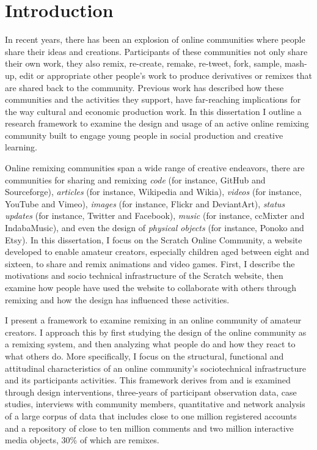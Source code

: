 \chapter{Introduction}

In recent years, there has been an explosion of online communities where people share their ideas and creations.
Participants of these communities not only share their own work, they also remix, re-create, remake, re-tweet, fork, sample, mash-up, edit or appropriate other people's work to produce derivatives or remixes that are shared back to the community.
Previous work has described how these communities and the activities they support, have far-reaching implications for the way cultural and economic production work.
In this dissertation I outline a research framework to examine the design and usage of an active online remixing community built to engage young people in social production and creative learning.

Online remixing communities span a wide range of creative endeavors, there are communities for sharing and remixing 
\emph{code} (for instance, GitHub and Sourceforge),
\emph{articles} (for instance, Wikipedia and Wikia), 
\emph{videos} (for instance, YouTube and Vimeo), 
\emph{images} (for instance, Flickr and DeviantArt), 
\emph{status updates} (for instance, Twitter and Facebook),
\emph{music} (for instance, ccMixter and IndabaMusic),
and even the design of \emph{physical objects} (for instance, Ponoko and Etsy).
In this dissertation, I focus on the Scratch Online Community, a website developed to enable amateur creators, especially children aged between eight and sixteen, to share and remix animations and video games.
First, I describe the motivations and socio technical infrastructure of the Scratch website, then examine how people have used the website to collaborate with others through remixing and how the design has influenced these activities.

I present a framework to examine remixing in an online community of amateur creators. 
I approach this by first studying the design of the online community as a remixing system, and then analyzing what people do and how they react to what others do.
More specifically, I focus on the structural, functional and attitudinal characteristics of an online community's sociotechnical infrastructure and its participants activities.
This framework derives from and is examined through design interventions, three-years of participant observation data, case studies, interviews with community members, quantitative and network analysis of a large corpus of data that includes close to one million registered accounts and a repository of close to ten million comments and two million interactive media objects, 30\% of which are remixes.

